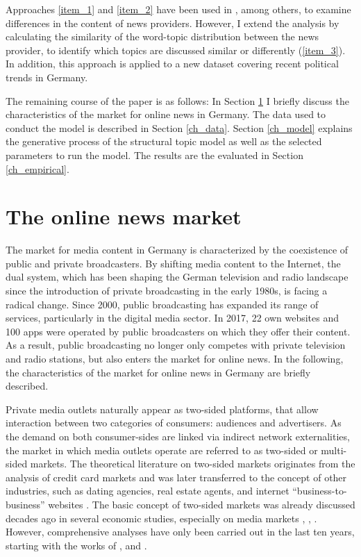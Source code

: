 \documentclass[12pt,a4paper,notitlepage]{article}
\begin{document}
Approaches \ref{item_1} and \ref{item_2} have been used in \citet{roberts_model_2016}, among others, to examine differences in the content of news providers. However, I extend the analysis by calculating the similarity of the word-topic distribution between the news provider, to identify which topics are discussed similar or differently (\ref{item_3}). In addition, this approach is applied to a new dataset covering recent political trends in Germany.

The remaining course of the paper is as follows: In Section \ref{ch_onlinenews} I briefly discuss the characteristics of the market for online news in Germany. The data used to conduct the model is described in Section \ref{ch_data}. Section \ref{ch_model} explains the generative process of the structural topic model as well as the selected parameters to run the model. The results are the evaluated in Section \ref{ch_empirical}. 
 
\section{The online news market}\label{ch_onlinenews}

The market for media content in Germany is characterized by the coexistence of public and private broadcasters. By shifting media content to the Internet, the dual system, which has been shaping the German television and radio landscape since the introduction of private broadcasting in the early 1980s, is facing a radical change. Since 2000, public broadcasting has expanded its range of services, particularly in the digital media sector. In 2017, 22 own websites and 100 apps were operated by public broadcasters on which they offer their content. As a result, public broadcasting no longer only competes with private television and radio stations, but also enters the market for online news. In the following, the characteristics of the market for online news in Germany are briefly described. 

Private media outlets naturally appear as two-sided platforms, that allow interaction between two categories of consumers: audiences and advertisers. As the demand on both consumer-sides are linked via indirect network externalities, the market in which media outlets operate are referred to as two-sided or multi-sided markets. The theoretical literature on two-sided markets originates from the analysis of credit card markets \citep{rochet_platform_2003} and was later transferred to the concept of other industries, such as dating agencies, real estate agents, and internet “business-to-business” websites \citep{caillaud_chicken_2003}. The basic concept of two-sided markets was already discussed decades ago in several economic studies, especially on media markets \citep{corden_maximisation_1952}, \citep{gustafsson_circulation_1978}, \citep{blair_pricing_1993}. However, comprehensive analyses have only been carried out in the last ten years, starting with the works of \citet{rochet_platform_2003}, \citet{evans_empirical_2003} and \citet{armstrong_competition_2006}.
\end{document}
